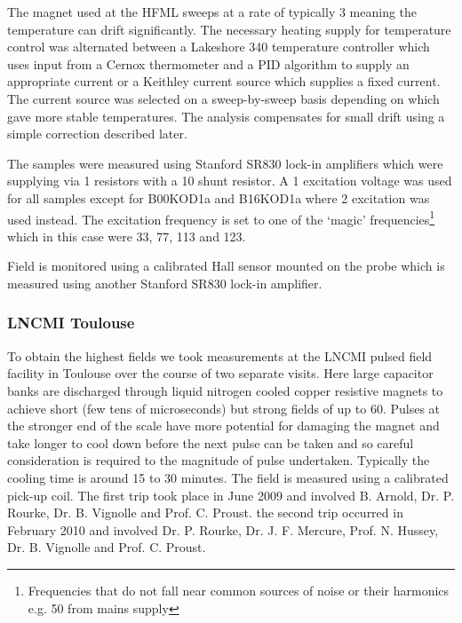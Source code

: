 The magnet used at the \ac{HFML} sweeps at a rate of typically \unit{3}{\tesla\per\minute} meaning the temperature can drift significantly. The necessary heating supply for temperature control was alternated between a Lakeshore 340 temperature controller which uses input from a Cernox thermometer and a PID algorithm to supply an appropriate current or a Keithley current source which supplies a fixed current. The current source was selected on a sweep-by-sweep basis depending on which gave more stable temperatures.  The analysis compensates for small drift using a simple correction described later. 

The samples were measured using Stanford SR830 lock-in amplifiers which were supplying via \unit{1}{\kilo\ohm} resistors with a \unit{10}{\ohm} shunt resistor. A \unit{1}{\volt} excitation voltage was used for all samples except for B00KOD1a and B16KOD1a where \unit{2}{\volt} excitation was used instead. The excitation frequency is set to one of the `magic' frequencies\footnote{Frequencies that do not fall near common sources of noise or their harmonics e.g. \unit{50}{\hertz} from mains supply} which in this case were \unit{33}{\hertz}, \unit{77}{\hertz}, \unit{113}{\hertz} and \unit{123}{\hertz}.

Field is monitored using a calibrated Hall sensor mounted on the probe which is measured using another Stanford SR830 lock-in amplifier.

\subsubsection{\ac{LNCMI} Toulouse}

To obtain the highest fields we took measurements at the \ac{LNCMI} pulsed field facility in Toulouse over the course of two separate visits. Here large capacitor banks are discharged through liquid nitrogen cooled copper resistive magnets to achieve short (few tens of microseconds) but strong fields of up to \unit{60}{\tesla}. Pulses at the stronger end of the scale have more potential for damaging the magnet and take longer to cool down before the next pulse can be taken and so careful consideration is required to the magnitude of pulse undertaken. Typically the cooling time is around 15 to 30 minutes. The field is measured using a calibrated pick-up coil. The first trip took place in June 2009 and involved B. Arnold, Dr. P. Rourke, Dr. B. Vignolle and Prof. C. Proust. the second trip occurred in February 2010 and involved Dr. P. Rourke, Dr. J. F. Mercure, Prof. N. Hussey, Dr. B. Vignolle and Prof. C. Proust.

